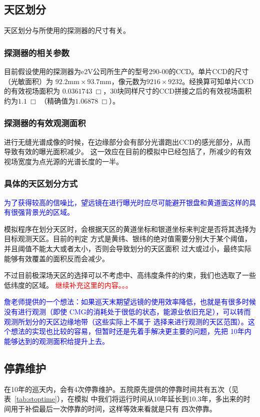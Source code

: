\documentclass[a4paper,11pt]{ctexart}
\newcommand{\RT}[1]{\textcolor{red}{#1}}
\newcommand{\BT}[1]{\textcolor{blue}{#1}}
\begin{document}
\subsection{天区划分}

天区划分与所使用的探测器的尺寸有关。

\subsubsection{探测器的相关参数}
目前假设使用的探测器为e2V公司所生产的型号290-00的CCD。单片CCD的尺寸（光敏面积）为
$92.2\text{mm}\times93.7\text{mm}$，像元数为$9216\times 9232$。经换算可知单片CCD的有效视场面积为
$0.0361743~\Box$\textdegree，30块同样尺寸的CCD拼接之后的有效视场面积约为$1.1~\Box$\textdegree
（精确值为$1.06878~\Box$\textdegree）。

\subsubsection{探测器的有效观测面积}

进行无缝光谱成像的时候，在边缘部分会有部分光谱跑出CCD的感光部分，从而导致有效的曝光面积减少。
这一效应在目前的模拟中已经包括了，所减少的有效视场宽度为点光源的光谱长度的一半。

\subsubsection{具体的天区划分方式}

\BT{\heiti 为了获得较高的信噪比，望远镜在进行曝光时应尽可能避开银盘和黄道面这样的具有很强背景光的区域。}

模拟程序在划分天区时，会根据天区的黄道坐标和银道坐标来判定是否将其选择为目标观测天区。目前的判定
方式是黄纬、银纬的绝对值需要分别大于某个阈值，并且阈值不能太大或者太小，否则会导致划分的天区面积
过大或过小，最终实际能够有效覆盖的面积反而会减少。

不过目前极深场天区的选择可以不考虑中、高纬度条件的约束，我们也选取了一些低纬度的区域。
\RT{继续补充这里的内容。。。}

\BT{詹老师提供的一个想法：如果巡天末期望远镜的使用效率降低，也就是有很多时候没有进行观测（即使
CMG的消耗处于很低的状态，能源业依旧充足），可以转而观测所划分的天区边缘地带（这些实际上不属于
选择来进行观测的天区范围）。这个想法的实现也比较的容易，但暂时还是先着手解决更主要的问题，先把
10年内能够达到的观测面积给提升上去。}

\subsection{停靠维护}
在10年的巡天内，会有4次停靠维护。五院原先提供的停靠时间共有五次（见表~\ref{tab:stoptime}），在模拟
中我们将运行时间从10年延长到10.3年，多出来的时间用于补偿最后一次停靠的时间，这样等效来看就是只有
四次停靠。
\end{document}
